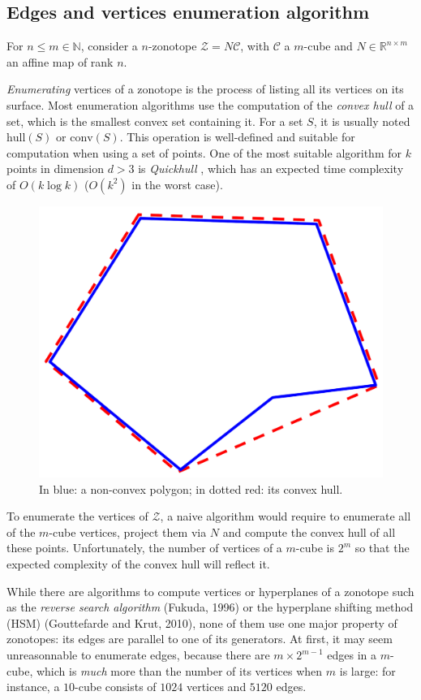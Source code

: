 \subsection{Edges and vertices enumeration algorithm}
For $n\leq m \in\mathbb{N}$, consider a $n$-zonotope $\mathcal{Z} = N\mathcal{C}$, 
with $\mathcal{C}$ a $m$-cube and $N\in \mathbb{R}^{n\times m}$ an affine map of rank $n$.

\textit{Enumerating} vertices of a zonotope is the process 
of listing all its vertices on its surface. Most enumeration algorithms use the computation of the \textit{convex hull} of 
a set, which is the smallest convex set containing it. For a set $S$, it is usually noted $\text{hull}(S)$ or $\text{conv}(S)$.
This operation is well-defined and suitable for computation when using a set of points. One of the most 
suitable algorithm for $k$ points in dimension $d > 3$ is \textit{Quickhull} \cite{barberQuickhullAlgorithmConvex1996}, which has an expected time complexity 
of $O(k\log k)$ ($O(k^2)$ in the worst case). 

\begin{figure}[h]
    \centering
    \includegraphics[width=0.4\linewidth]{img/zonotopes/convexHullExample.png}
    \caption{In blue: a non-convex polygon; in dotted red: its convex hull.}
    \label{im:convexHull}
\end{figure}


To enumerate the vertices of $\mathcal{Z}$, a naive algorithm would require to enumerate 
all of the $m$-cube vertices, project them via $N$ and compute the convex hull of all these points.
Unfortunately, the number of vertices of a $m$-cube is $2^m$ so that the expected complexity of the convex hull 
will reflect it.

While there are algorithms to compute vertices or hyperplanes of a zonotope such as the \textit{reverse search algorithm} 
(Fukuda, 1996) or the hyperplane shifting method (HSM) (Gouttefarde and Krut, 2010), 
none of them use one major property of zonotopes:
its edges are parallel to one of its generators. At first, it may seem unreasonnable to enumerate edges,
because there are $m\times 2^{m-1}$ edges in a $m$-cube, which is \textit{much} more than the number of 
its vertices when $m$ is large: for 
instance, a $10$-cube consists of $1024$ vertices and $5120$ edges.

